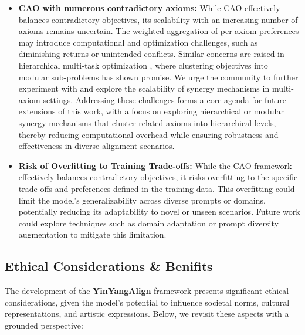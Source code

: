 \begin{itemize}
    \item \textbf{CAO with numerous contradictory axioms:} While CAO effectively balances contradictory objectives, its scalability with an increasing number of axioms remains uncertain. The weighted aggregation of per-axiom preferences may introduce computational and optimization challenges, such as diminishing returns or unintended conflicts. Similar concerns are raised in hierarchical multi-task optimization \cite{ma2020quadratic, liebenwein2021provable}, where clustering objectives into modular sub-problems has shown promise. We urge the community to further experiment with and explore the scalability of synergy mechanisms in multi-axiom settings. Addressing these challenges forms a core agenda for future extensions of this work, with a focus on exploring hierarchical or modular synergy mechanisms that cluster related axioms into hierarchical levels, thereby reducing computational overhead while ensuring robustness and effectiveness in diverse alignment scenarios.
    \item \textbf{Risk of Overfitting to Training Trade-offs:} While the CAO framework effectively balances contradictory objectives, it risks overfitting to the specific trade-offs and preferences defined in the training data. This overfitting could limit the model's generalizability across diverse prompts or domains, potentially reducing its adaptability to novel or unseen scenarios. Future work could explore techniques such as domain adaptation or prompt diversity augmentation to mitigate this limitation.
\end{itemize}

\subsection{Ethical Considerations \& Benifits}

The development of the \textbf{YinYangAlign} framework presents significant ethical considerations, given the model's potential to influence societal norms, cultural representations, and artistic expressions. Below, we revisit these aspects with a grounded perspective:


